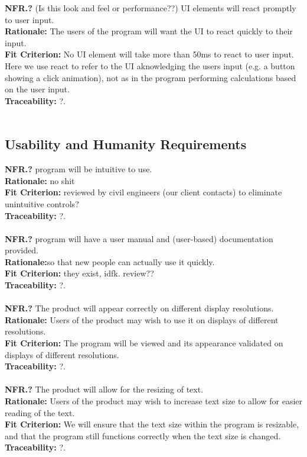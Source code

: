 \documentclass[12pt]{article}
\begin{document}
  \textbf{NFR.?} (Is this look and feel or performance??) UI elements will react promptly to user input.\\
  \textbf{Rationale:} The users of the program will want the UI to react quickly to their input.\\
  \textbf{Fit Criterion:} No UI element will take more than 50ms to react to user input. Here we use react to refer to the UI aknowledging the users input (e.g. a button showing a click animation), not as in the program performing calculations based on the user input.\\
  \textbf{Traceability:} ?.\\\\

\subsection{Usability and Humanity Requirements}

  \textbf{NFR.?} program will be intuitive to use.\\
  \textbf{Rationale:} no shit\\
  \textbf{Fit Criterion:} reviewed by civil engineers (our client contacts) to eliminate unintuitive controls?\\
  \textbf{Traceability:} ?.\\\\

  \textbf{NFR.?} program will have a user manual and (user-based) documentation provided.\\
  \textbf{Rationale:}so that new people can actually use it quickly.\\
  \textbf{Fit Criterion:} they exist, idfk. review??\\
  \textbf{Traceability:} ?.\\\\

  \textbf{NFR.?} The product will appear correctly on different display resolutions.\\
  \textbf{Rationale:} Users of the product may wish to use it on displays of different resolutions.\\
  \textbf{Fit Criterion:} The program will be viewed and its appearance validated on displays of different resolutions.\\
  \textbf{Traceability:} ?.\\\\

  \textbf{NFR.?} The product will allow for the resizing of text.\\
  \textbf{Rationale:} Users of the product may wish to increase text size to allow for easier reading of the text.\\
  \textbf{Fit Criterion:} We will ensure that the text size within the program is resizable, and that the program still functions correctly when the text size is changed.\\
  \textbf{Traceability:} ?.\\\\
\end{document}
